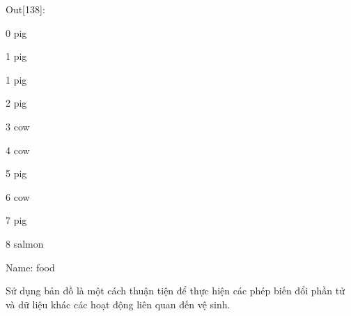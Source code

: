     \quad\textup{Out[138]: }\par
    \quad\textup{0 \quad\quad      pig }\par 
    \quad\textup{1 \quad\quad      pig }\par
    \quad\textup{1 \quad\quad      pig }\par
    \quad\textup{2 \quad \quad     pig }\par  
    \quad\textup{3 \quad \quad    cow }\par 
    \quad\textup{4 \quad \quad   cow }\par 
    \quad\textup{5  \quad \quad    pig }\par 
    \quad\textup{6  \quad  \quad   cow }\par 
    \quad\textup{7  \quad  \quad   pig }\par 
    \quad\textup{8  \quad  \quad   salmon}\par  
    \quad\textup{Name: food }\par
Sử dụng bản đồ là một cách thuận tiện để thực hiện các phép biến đổi phần tử và dữ liệu khác 
các hoạt động liên quan đến vệ sinh.\par    

